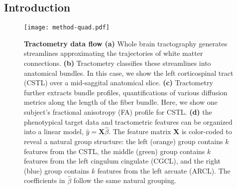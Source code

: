 \subsection*{Introduction}

\begin{figure}[!h]
    \vspace{0.25cm}
    \vspace{-9.75cm}
    \texttt{[image: method-quad.pdf]}
    {\label{fig:methods:tractogram}}
    {\label{fig:methods:cst}}
    {\label{fig:methods:tract-profile}}
    {\label{fig:methods:group-structure}}
    \caption{{\bf Tractometry data flow}
        \label{fig:methods}
        {\bf (a)} Whole brain tractography generates streamlines approximating
        the trajectories of white matter connections.
        {\bf (b)} Tractometry classifies these streamlines into anatomical bundles.
        In this case, we show the left corticospinal tract (CSTL) over a mid-saggital
        anatomical slice.
        {\bf (c)} Tractometry further extracts bundle profiles,
        quantifications of various diffusion metrics along the length of the
        fiber bundle. Here, we show one subject's fractional anisotropy (FA)
        profile for CSTL.
        {\bf (d)} the phenotypical target data and tractometric features can
        be organized into a linear model, $\hat{y} = \mathbf{X}
        \hat{\beta}$. The feature matrix $\mathbf{X}$ is color-coded
        to reveal a natural group structure: the left (orange) group
        contains $k$ features from the CSTL, the middle (green) group
        contains $k$ features from the left cingulum cingulate (CGCL),
        and the right (blue) group
        contains $k$ features from the left arcuate (ARCL). The coefficients in
        $\hat{\beta}$ follow the same natural grouping.
    }
\end{figure}

